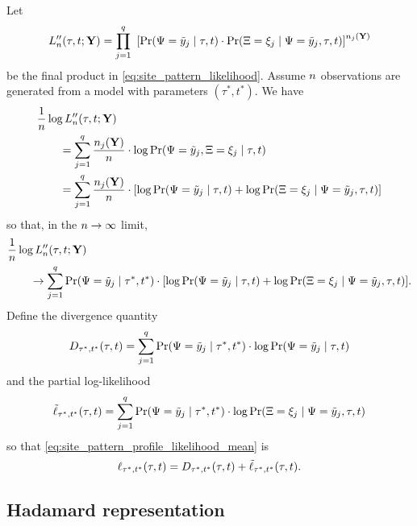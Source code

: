 Let
\[
L_n''(\tau, t; \mathbf{Y}) = \prod_{j=1}^{q} \ \left[\Pr(\Psi=\tilde{y}_j \mid \tau, t) \cdot \Pr(\Xi=\xi_j \mid \Psi=\tilde{y}_j, \tau, t)\right] ^{n_j(\mathbf{Y})}
\]
be the final product in \eqref{eq:site_pattern_likelihood}.
Assume $n$ observations are generated from a model with parameters $(\tau^*, t^*)$.
We have
\begin{equation*}
\begin{split}
&    \frac{1}{n} \log L_n''(\tau, t; \mathbf{Y}) \\
&\qquad = \sum_{j=1}^q \frac{n_j(\mathbf{Y})}{n}\cdot  \log \Pr(\Psi=\tilde{y}_j, \Xi=\xi_j \mid \tau, t) \\
&\qquad = \sum_{j=1}^q \frac{n_j(\mathbf{Y})}{n}\cdot [\log \Pr(\Psi=\tilde{y}_j \mid \tau, t) +
            \log \Pr(\Xi=\xi_j \mid \Psi=\tilde{y}_j , \tau, t)]
\end{split}
\end{equation*}
so that, in the $n\rightarrow\infty$ limit,
\begin{equation}
\begin{split}
&    \frac{1}{n} \log L_n''(\tau, t; \mathbf{Y}) \\
&\qquad \rightarrow \sum_{j=1}^q \Pr(\Psi=\tilde{y}_j \mid \tau^*, t^*) \cdot [\log \Pr(\Psi=\tilde{y}_j \mid \tau, t) + \log \Pr(\Xi=\xi_j \mid \Psi=\tilde{y}_j , \tau, t)]. \label{eq:site_pattern_profile_likelihood_mean}
\end{split}
\end{equation}
Define the divergence quantity
\[
D_{\tau^*,t^*}(\tau,t) = \sum_{j=1}^q \Pr(\Psi=\tilde{y}_j \mid \tau^*, t^*)\cdot\log \Pr(\Psi=\tilde{y}_j \mid \tau, t)
\]
and the partial log-likelihood
\[
\tilde{\ell}_{\tau^*,t^*}(\tau, t) = \sum_{j=1}^q \Pr(\Psi=\tilde{y}_j \mid \tau^*, t^*)\cdot\log \Pr(\Xi=\xi_j \mid \Psi = \tilde{y}_j, \tau, t)
\]
so that \eqref{eq:site_pattern_profile_likelihood_mean} is
\begin{equation}
    \label{eq:log_likelihood_simplified}
    \ell_{\tau^*,t^*}(\tau, t) = D_{\tau^*,t^*}(\tau,t) + \tilde{\ell}_{\tau^*,t^*}(\tau, t).
\end{equation}

\subsection*{Hadamard representation}

